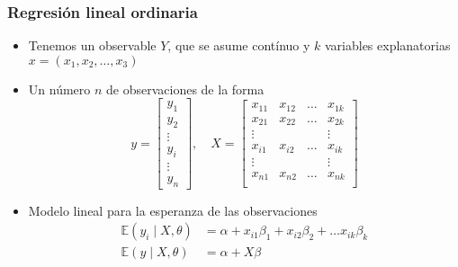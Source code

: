 \documentclass[xcolor=dvipsnames,10pt]{beamer}
\begin{document}
\begin{frame}
  \frametitle{Regresión lineal ordinaria}
  \begin{itemize}
  \item Tenemos un observable $Y$, que se asume contínuo y $k$ variables explanatorias $x = (x_1, x_2, \dots, x_3)$
  \item Un número $n$ de observaciones de la forma
    \begin{equation*}
      y =
      \begin{bmatrix}
        y_1\\y_2\\\vdots\\y_i\\\vdots\\y_n
      \end{bmatrix}, \quad%
      X = \begin{bmatrix}
        x_{11} & x_{12} & \hdots & x_{1k}\\
        x_{21} & x_{22} & \hdots & x_{2k}\\
        \vdots & & & \vdots\\
        x_{i1} & x_{i2} & \hdots & x_{ik}\\
        \vdots & & & \vdots\\
        x_{n1} & x_{n2} & \hdots & x_{nk}\\
      \end{bmatrix}
    \end{equation*}
  \item Modelo lineal para la esperanza de las observaciones
    \begin{align*}
      \mathbb{E}(y_i \mid X, \theta) &= \alpha + x_{i1} \beta_1 + x_{i2} \beta_2 + \dots x_{ik} \beta_k \\
      \mathbb{E}(y \mid X, \theta) &= \alpha + X \beta
    \end{align*}
  \end{itemize}
\end{frame}
%
\end{document}
